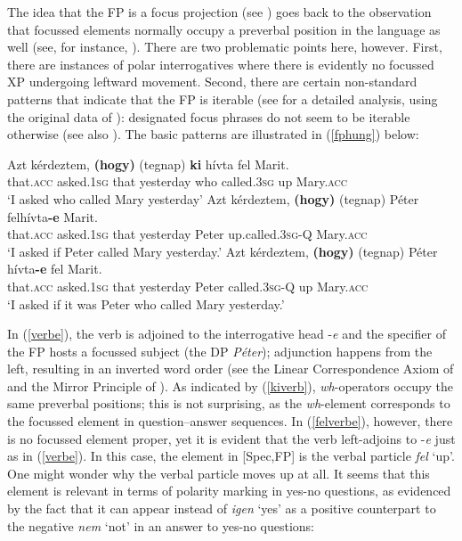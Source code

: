 The idea that the FP is a focus projection (see \citealt{vancraenenbroeckliptak2008}) goes back to the observation that focussed elements normally occupy a preverbal position in the language as well (see, for instance, \citealt{ekiss2002}). There are two problematic points here, however. First, there are instances of polar interrogatives where there is evidently no focussed XP undergoing leftward movement. Second, there are certain non-standard patterns that indicate that the FP is iterable (see \citealt{bacskaiatkari2018kenesei} for a detailed analysis, using the original data of \citealt{kenesei1994}): designated focus phrases do not seem to be iterable otherwise (see also \citealt{rizzi1997}). The basic patterns are illustrated in (\ref{fphung}) below:

\ea \label{fphung}
\ea \gll Azt kérdeztem, \textbf{(hogy)} (tegnap) \textbf{ki} hívta fel Marit. \label{kiverb}\\
that.\textsc{acc} asked.\textsc{1sg} \phantom{\textbf{(}}that \phantom{(}yesterday who called.\textsc{3sg} up Mary.\textsc{acc}\\
\glt `I asked who called Mary yesterday'
\ex \gll Azt kérdeztem, \textbf{(hogy)} (tegnap) Péter felhívta\textbf{-e} Marit. \label{felverbe}\\
that.\textsc{acc} asked.\textsc{1sg} \phantom{\textbf{(}}that \phantom{(}yesterday Peter up.called.\textsc{3sg}-Q Mary.\textsc{acc}\\
\glt `I asked if Peter called Mary yesterday.'
\ex \gll Azt kérdeztem, \textbf{(hogy)} (tegnap) Péter hívta\textbf{-e} fel Marit. \label{verbe}\\
that.\textsc{acc} asked.\textsc{1sg} \phantom{\textbf{(}}that \phantom{(}yesterday Peter called.\textsc{3sg}-Q up Mary.\textsc{acc}\\
\glt `I asked if it was Peter who called Mary yesterday.'
\z
\z

In (\ref{verbe}), the verb is adjoined to the interrogative head -\textit{e} and the specifier of the FP hosts a focussed subject (the DP \textit{Péter}); adjunction happens from the left, resulting in an inverted word order (see the Linear Correspondence Axiom of \citealt{kayne1994} and the Mirror Principle of \citealt{baker1985, baker1988}). As indicated by (\ref{kiverb}), \textit{wh}-operators occupy the same preverbal positions; this is not surprising, as the \textit{wh}-element corresponds to the focussed element in question--answer sequences. In (\ref{felverbe}), however, there is no focussed element proper, yet it is evident that the verb left-adjoins to -\textit{e} just as in (\ref{verbe}). In this case, the element in [Spec,FP] is the verbal particle \textit{fel} `up'. One might wonder why the verbal particle moves up at all. It seems that this element is relevant in terms of polarity marking in yes-no questions, as evidenced by the fact that it can appear instead of \textit{igen} `yes' as a positive counterpart to the negative \textit{nem} `not' in an answer to yes-no questions:

